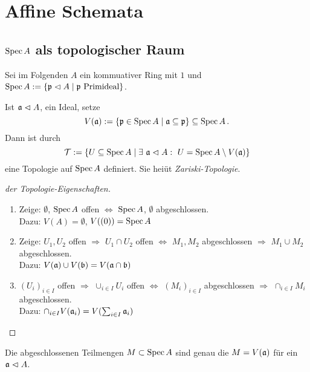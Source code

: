 \section{Affine Schemata}

\subsection{$\operatorname{Spec} A$ als topologischer Raum}

Sei im Folgenden $A$ ein kommuativer Ring mit $1$ und 
$\operatorname{Spec} A := \{\mathfrak{p} \vartriangleleft A \mid \mathfrak{p} \text{ Primideal}\}$.

\begin{definition}
	Ist $\mathfrak{a} \vartriangleleft A$, ein Ideal, setze
	\[
		V(\mathfrak{a}) := \{\mathfrak{p} \in \operatorname{Spec} A \mid \mathfrak{a} \subseteq \mathfrak{p} \} \subseteq \operatorname{Spec} A\,.
	\]
	Dann ist durch
	\[
		\mathcal T := \{ U \subseteq \operatorname{Spec} A \mid
			\exists\ \mathfrak{a} \vartriangleleft A:\ U = \operatorname{Spec} A \setminus V(\mathfrak{a})\}
	\]
	eine Topologie auf $\operatorname{Spec} A$ definiert. Sie heiüt \emph{Zariski-Topologie}.
\end{definition}

\begin{proof}[der Topologie-Eigenschaften]
	\begin{enumerate}
	  \item Zeige: $\emptyset$, $\operatorname{Spec} A$ offen $\Longleftrightarrow$ 
	  	$\operatorname{Spec} A$, $\emptyset$ abgeschlossen.\\
	  	Dazu: $V(A) = \emptyset$, $V((0)) = \operatorname{Spec} A$
	  \item Zeige: $U_1, U_2$ offen $\Rightarrow$ $U_1 \cap U_2$ offen
	  	$\Longleftrightarrow$ $M_1,M_2$ abgeschlossen $\Rightarrow$
	  	$M_1 \cup M_2$ abgeschlossen.\\
	  	Dazu:
	  	$V(\mathfrak{a}) \cup V(\mathfrak b) = V(\mathfrak{a} \cap \mathfrak b)$
	  \item $(U_i)_{i\in I}$ offen $\Rightarrow$ $\cup_{i\in I} U_i$ offen
	  	$\Longleftrightarrow$ $(M_i)_{i\in I}$ abgeschlossen
	  	$\Rightarrow$ $\cap_{i\in I} M_i$ abgeschlossen.\\
	  	Dazu:
	  	$\cap_{i\in I} V(\mathfrak{a}_i) = V(\sum_{i\in I} \mathfrak{a}_i)$
	\end{enumerate}
\end{proof}

\begin{bemerkung}
	Die abgeschlossenen Teilmengen $M \subset \operatorname{Spec} A$ sind genau die 
	$M = V(\mathfrak{a})$ für ein $\mathfrak{a} \vartriangleleft A$.
\end{bemerkung}

